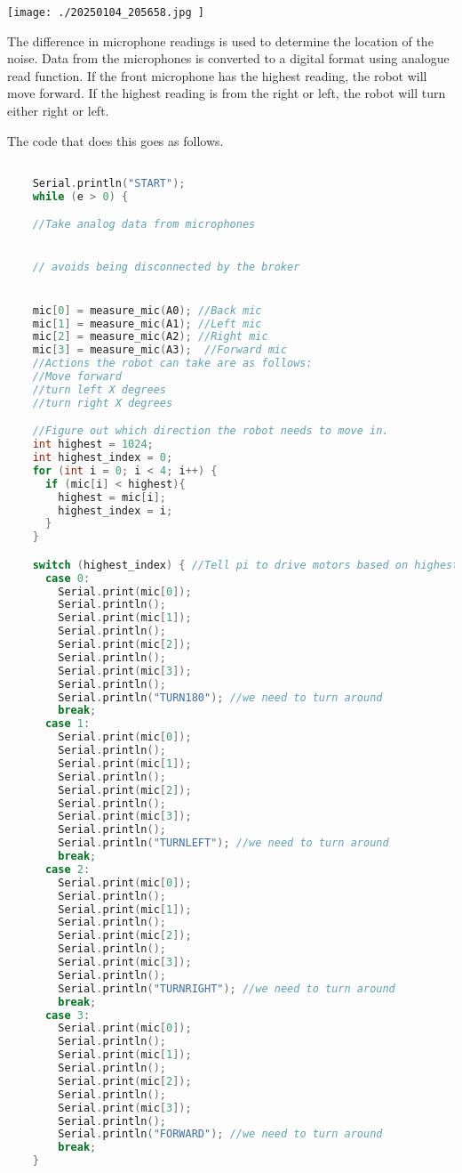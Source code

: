 \documentclass[12pt,a4paper]{article}
\begin{document}
\texttt{[image:  ./20250104\_205658.jpg ]}

\clearpage

\newpage

The difference in microphone readings is used to determine the location of the noise.
Data from the microphones is converted to a digital format using analogue read function.
If the front microphone has the highest reading, the robot will move forward.
If the highest reading is from the right or left, the robot will turn either right or left.

The code that does this goes as follows.

\begin{lstlisting}[language=C, caption=Microphone Code]

    Serial.println("START");
    while (e > 0) {

    //Take analog data from microphones


    // avoids being disconnected by the broker


    mic[0] = measure_mic(A0); //Back mic
    mic[1] = measure_mic(A1); //Left mic
    mic[2] = measure_mic(A2); //Right mic
    mic[3] = measure_mic(A3);  //Forward mic
    //Actions the robot can take are as follows:
    //Move forward
    //turn left X degrees
    //turn right X degrees

    //Figure out which direction the robot needs to move in.
    int highest = 1024;
    int highest_index = 0;
    for (int i = 0; i < 4; i++) {
      if (mic[i] < highest){
        highest = mic[i];
        highest_index = i;
      }
    }

    switch (highest_index) { //Tell pi to drive motors based on highest reading.
      case 0:
        Serial.print(mic[0]);
        Serial.println();
        Serial.print(mic[1]);
        Serial.println();
        Serial.print(mic[2]);
        Serial.println();
        Serial.print(mic[3]);
        Serial.println();
        Serial.println("TURN180"); //we need to turn around
        break;
      case 1:
        Serial.print(mic[0]);
        Serial.println();
        Serial.print(mic[1]);
        Serial.println();
        Serial.print(mic[2]);
        Serial.println();
        Serial.print(mic[3]);
        Serial.println();
        Serial.println("TURNLEFT"); //we need to turn around
        break;
      case 2:
        Serial.print(mic[0]);
        Serial.println();
        Serial.print(mic[1]);
        Serial.println();
        Serial.print(mic[2]);
        Serial.println();
        Serial.print(mic[3]);
        Serial.println();
        Serial.println("TURNRIGHT"); //we need to turn around
        break;
      case 3:
        Serial.print(mic[0]);
        Serial.println();
        Serial.print(mic[1]);
        Serial.println();
        Serial.print(mic[2]);
        Serial.println();
        Serial.print(mic[3]);
        Serial.println();
        Serial.println("FORWARD"); //we need to turn around
        break;
    }




\end{lstlisting}
\end{document}
